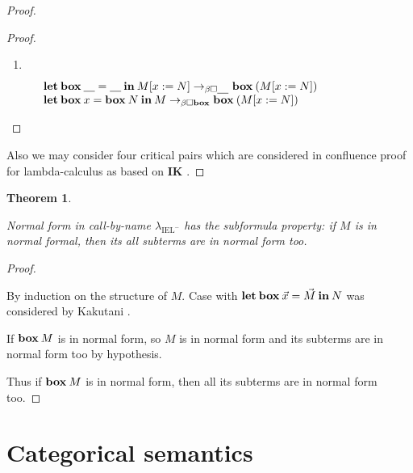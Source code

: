 \documentclass[a4paper]{article}
\newtheorem{theorem}{Theorem}
\begin{document}
\begin{proof}
\begin{proof}
\begin{enumerate}
\item $ $ \\


$\begin{array}{lll}
&{\bf let \: box \:} \underline{\quad} = \underline{\quad} {\: \bf in \:} M [x := N] \rightarrow_{\beta \Box \underline{\quad}} {\bf box \:} (M [x := N])& \\
&{\bf let \: box \:} x = {\bf box \:} N {\: \bf in \:} M \rightarrow_{\beta \Box {\bf box}} {\bf box \:} (M [x := N])&
\end{array}$
\end{enumerate}
\end{proof}

Also we may consider four critical pairs which are considered in
confluence proof for lambda-calculus as based on {\bf IK} \cite{ModalK}.

\end{proof}

\begin{theorem}
  $ $

  Normal form in call-by-name $\lambda_{\text{IEL}^{-}}$ has the subformula property: if $M$ is in normal formal, then its all subterms are in normal form too.

\end{theorem}

\begin{proof}
  $ $

  By induction on the structure of $M$.
  Case with ${\bf let \: box \:} \vec{x} = \vec{M} {\: \bf in \:} N$ was considered by Kakutani \cite{ModalK} \cite{ModalK1}.

  If ${\bf box \:} M$ is in normal form, so $M$ is in normal form and its subterms are in normal form too by hypothesis.

  Thus if ${\bf box \:} M$ is in normal form, then all its subterms are in normal form too.
\end{proof}

\section{Categorical semantics}
\end{document}
